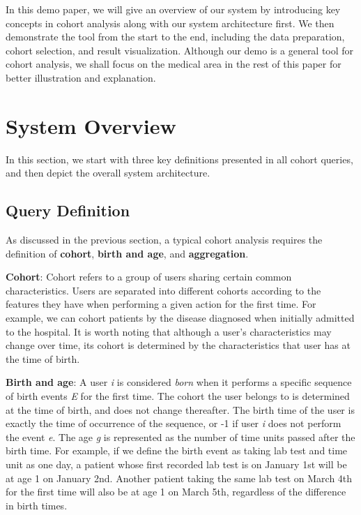 \documentclass[10pt,conference,letterpaper]{IEEEtran}
\begin{document}
In this demo paper, we will give an overview of our system by introducing key concepts in cohort analysis along with our system architecture first. We then demonstrate the tool from the start to the end, including the data preparation, cohort selection, and result visualization.
Although our demo is a general tool for cohort analysis, we shall focus on the medical area in the rest of this paper for better illustration and explanation.

\section{System Overview}
In this section, we start with three key definitions presented in all cohort queries, and then depict the overall system architecture.  

\subsection{Query Definition}
As discussed in the previous section, a typical cohort analysis requires the definition of \textbf{cohort}, \textbf{birth and age}, and \textbf{aggregation}. 

\textbf{Cohort}: Cohort refers to a group of users sharing certain common characteristics. Users are separated into different cohorts according to the features they have when performing a given action for the first time. For example, we can cohort patients by the disease diagnosed when initially admitted to the hospital. It is worth noting that although a user's characteristics may change over time, its cohort is determined by the characteristics that user has at the time of birth.

\textbf{Birth and age}: A user \emph{i} is considered \emph{born} when it performs a specific sequence of birth events \emph{E} for the first time.
The cohort the user belongs to is determined at the time of birth, and does not change thereafter.
The birth time of the user is exactly the time of occurrence of the sequence, or -1 if user \emph{i} does not perform the event \emph{e}. 
The age \emph{g} is represented as the number of time units passed after the birth time. For example, if we define the birth event as taking lab test and time unit as one day, a patient whose first recorded lab test is on January 1st will be at age 1 on January 2nd. 
Another patient taking the same lab test on March 4th for the first time will also be at age 1 on March 5th, regardless of the difference in birth times. 
\end{document}
